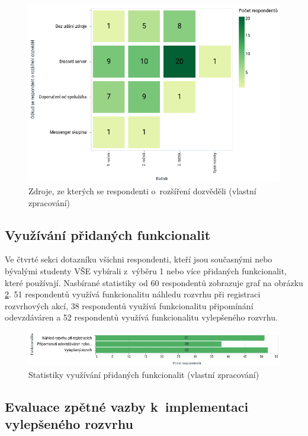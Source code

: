 \begin{figure}[htbp!]\centering
    \includegraphics[width=\textwidth]{img/zdroj-instalace.png}
    \caption{Zdroje, ze kterých se respondenti o~rozšíření dozvěděli (vlastní zpracování)}
    \label{fig:zdroj-instalace}
\end{figure}

\subsection{Využívání přidaných funkcionalit}

Ve čtvrté sekci dotazníku všichni respondenti, kteří jsou současnými nebo bývalými studenty VŠE vybírali z~výběru 1 nebo více přidaných funkcionalit, které používají. Nasbírané statistiky od 60 respondentů zobrazuje graf na obrázku \ref{fig:features-data}. 51 respondentů využívá funkcionalitu náhledu rozvrhu při registraci rozvrhových akcí, 38 respondentů využívá funkcionalitu připomínání odevzdáváren a 52 respondentů využívá funkcionalitu vylepšeného rozvrhu. 

\begin{figure}[htbp!]\centering
    \includegraphics[width=\textwidth]{img/features.png}
    \caption{Statistiky využívání přidaných funkcionalit (vlastní zpracování)}
    \label{fig:features-data}
\end{figure}

\subsection{Evaluace zpětné vazby k~implementaci vylepšeného rozvrhu}


